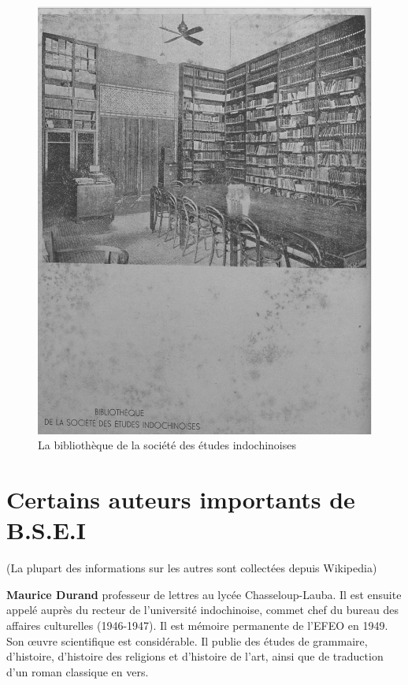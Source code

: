 \begin{figure}[H] %
    \centering
    \includegraphics[width=1\linewidth]{img/bibliotheque.PNG}
    \caption{La bibliothèque de la société des études indochinoises}
    \label{fig:enter-label}
\end{figure}

\newpage
\section{Certains auteurs importants de B.S.E.I}

(La plupart des informations sur les autres sont collectées depuis Wikipedia)

\textbf{Maurice Durand} professeur de lettres au lycée Chasseloup-Lauba. Il est ensuite appelé auprès du recteur de l'université indochinoise, commet chef du bureau des affaires culturelles (1946-1947). Il est mémoire permanente de l’EFEO en 1949. Son œuvre scientifique est considérable. Il publie des études de grammaire, d'histoire, d'histoire des religions et d'histoire de l'art, ainsi que de traduction d'un roman classique en vers.

